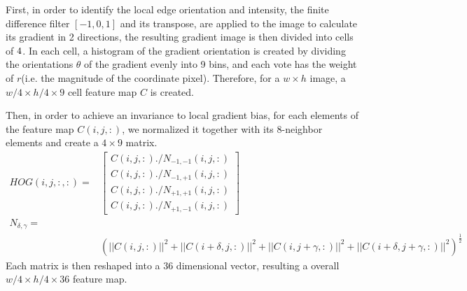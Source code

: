 \documentclass[12pt]{article}
\begin{document}
First, in order to identify the local edge orientation and intensity, the finite difference filter $[-1,0,1]$ and its transpose, are applied to the image to calculate its gradient in 2 directions, the resulting gradient image is then divided into cells of $4\time4$. In each cell, a histogram of the gradient orientation is created by dividing the orientations $\theta$ of the gradient evenly into 9 bins, and each vote has the weight of $r$(i.e. the magnitude of the coordinate pixel). Therefore, for a $ w\times h$ image,  a $w/4 \times h/4 \times 9$ cell feature map $C$ is created. 

Then, in order to achieve an invariance to local gradient bias, for each elements of the feature map $C(i,j,:)$, we normalized it together with its 8-neighbor elements and create a $4\times 9$ matrix.
\begin{equation}
\begin{aligned}
HOG(i,j,:,:) =&  \left[\begin{array}{c}
C(i,j,:)./N_{-1,-1}(i,j,:)\\
C(i,j,:)./N_{-1,+1}(i,j,:)\\
C(i,j,:)./N_{+1,+1}(i,j,:)\\
C(i,j,:)./N_{+1,-1}(i,j,:)\end{array}\right]\\
 N_{\delta,\gamma} =&\\
 & (||C(i,j,:)||^2+||C(i+\delta,j,:)||^2+||C(i,j+\gamma,:)||^2+||C(i+\delta,j+\gamma,:)||^2)^{\frac{1}{2}}
\end{aligned}
\end{equation}\cite{felzenszwalb2010object}
Each matrix is then reshaped into a 36 dimensional vector, resulting a overall $ w/4 \times h/4 \times 36$ feature map.
\end{document}
